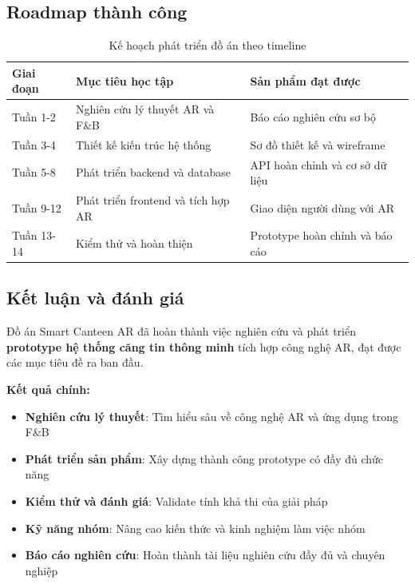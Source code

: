 \documentclass[12pt,a4paper]{article}
\begin{document}
\subsection{Roadmap thành công}

\begin{table}[H]
\centering
\caption{Kế hoạch phát triển đồ án theo timeline}
\label{tab:project-timeline}
\begin{tabular}{@{}p{2cm}p{5cm}p{5cm}@{}}
\toprule
\textbf{Giai đoạn} & \textbf{Mục tiêu học tập} & \textbf{Sản phẩm đạt được} \\
\midrule
Tuần 1-2 & Nghiên cứu lý thuyết AR và F\&B & Báo cáo nghiên cứu sơ bộ \\
Tuần 3-4 & Thiết kế kiến trúc hệ thống & Sơ đồ thiết kế và wireframe \\
Tuần 5-8 & Phát triển backend và database & API hoàn chỉnh và cơ sở dữ liệu \\
Tuần 9-12 & Phát triển frontend và tích hợp AR & Giao diện người dùng với AR \\
Tuần 13-14 & Kiểm thử và hoàn thiện & Prototype hoàn chỉnh và báo cáo \\
\bottomrule
\end{tabular}
\end{table}

\subsection{Kết luận và đánh giá}

\begin{tcolorbox}[colback=blue!5!white,colframe=darkblue,title=\textbf{Thành quả đạt được}]
Đồ án Smart Canteen AR đã hoàn thành việc nghiên cứu và phát triển \textbf{prototype hệ thống căng tin thông minh} tích hợp công nghệ AR, đạt được các mục tiêu đề ra ban đầu.

\textbf{Kết quả chính:}
\begin{itemize}[leftmargin=0.5cm]
    \item \textbf{Nghiên cứu lý thuyết}: Tìm hiểu sâu về công nghệ AR và ứng dụng trong F\&B
    \item \textbf{Phát triển sản phẩm}: Xây dựng thành công prototype có đầy đủ chức năng
    \item \textbf{Kiểm thử và đánh giá}: Validate tính khả thi của giải pháp
    \item \textbf{Kỹ năng nhóm}: Nâng cao kiến thức và kinh nghiệm làm việc nhóm
    \item \textbf{Báo cáo nghiên cứu}: Hoàn thành tài liệu nghiên cứu đầy đủ và chuyên nghiệp
\end{itemize}
\end{tcolorbox}
\end{document}
